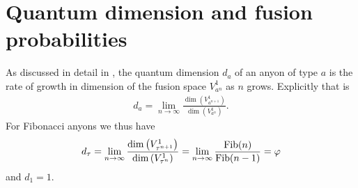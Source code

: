 











\section{Quantum dimension and fusion probabilities}

As discussed in detail in \cite{preskill}, the quantum dimension $d_a$ of an anyon of type $a$ is the rate of growth in dimension of the fusion space $V_{a^n}^1$ as $n$ grows.
Explicitly that is
\begin{align}
  d_a = \lim_{n\to\infty} \frac{\operatorname{dim}\left( V^1_{a^{n+1}} \right)}{\operatorname{dim}\left( V^1_{a^{n}} \right)}.
\end{align}
For Fibonacci anyons we thus have
\begin{align}
  d_\tau = \lim_{n\to\infty} \frac{\operatorname{dim}\left( V^1_{\tau^{n+1}} \right)}{\operatorname{dim}\left( V^1_{\tau^{n}} \right)}
  = \lim_{n\to\infty} \frac{\operatorname{Fib}(n)}{\operatorname{Fib}(n-1)} = \varphi
\end{align}
and $d_1 = 1$.


